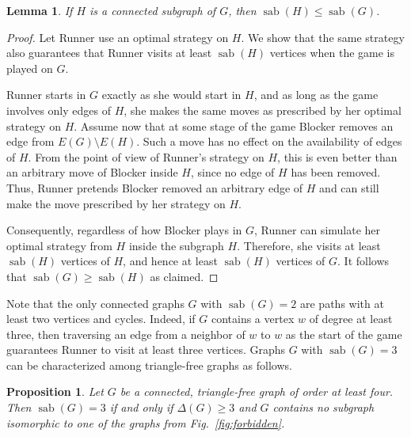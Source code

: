 \documentclass[12pt]{article}
\newtheorem{lemma}[theorem]{Lemma}
\newtheorem{proposition}[theorem]{Proposition}
\DeclareMathOperator{\sab}{\mathrm{sab}}
\begin{document}
\begin{lemma}\label{lem:subgraph}
If $H$ is a connected subgraph of $G$, then $\sab(H)\le \sab(G)$.
\end{lemma}

\begin{proof}
Let Runner use an optimal strategy on $H$. We show that the same strategy also guarantees that Runner visits at least $\sab(H)$ vertices when the game is played on $G$.

Runner starts in $G$ exactly as she would start in $H$, and as long as the game involves only edges of $H$, she makes the same moves as prescribed by her optimal strategy on $H$. Assume now that at some stage of the game Blocker removes an edge from $E(G)\setminus E(H)$. Such a move has no effect on the availability of edges of $H$. From the point of view of Runner's strategy on $H$, this is even better than an arbitrary move of Blocker inside $H$, since no edge of $H$ has been removed. Thus, Runner pretends Blocker removed an arbitrary edge of $H$ and can still make the move prescribed by her strategy on $H$.

Consequently, regardless of how Blocker plays in $G$, Runner can simulate her optimal strategy from $H$ inside the subgraph $H$. Therefore, she visits at least $\sab(H)$ vertices of $H$, and hence at least $\sab(H)$ vertices of $G$. It follows that $\sab(G)\ge \sab(H)$ as claimed.    
\end{proof}

Note that the only connected graphs $G$ with $\sab(G) = 2$ are paths with at least two vertices and cycles. Indeed, if $G$ contains a vertex $w$ of degree at least three, then traversing an edge from a neighbor of $w$ to $w$ as the start of the game guarantees Runner to visit at least three vertices.  Graphs $G$ with $\sab(G) = 3$ can be characterized among triangle-free graphs as follows. 

\begin{proposition}
\label{prp:delta=3-triangle-free}
Let $G$ be a connected, triangle-free graph of order at least four. Then $\sab(G) = 3$ if and only if $\Delta(G) \ge 3$ and $G$ contains no subgraph isomorphic to one of the graphs from Fig.~\ref{fig:forbidden}.  
\end{proposition}
\end{document}

